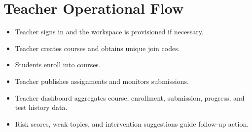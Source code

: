 \documentclass[10pt,twocolumn,a4paper]{article}
\begin{document}
\section{Teacher Operational Flow}
\begin{itemize}
  \item Teacher signs in and the workspace is provisioned if necessary.
  \item Teacher creates courses and obtains unique join codes.
  \item Students enroll into courses.
  \item Teacher publishes assignments and monitors submissions.
  \item Teacher dashboard aggregates course, enrollment, submission, progress, and test history data.
  \item Risk scores, weak topics, and intervention suggestions guide follow-up action.
\end{itemize}
\end{document}
